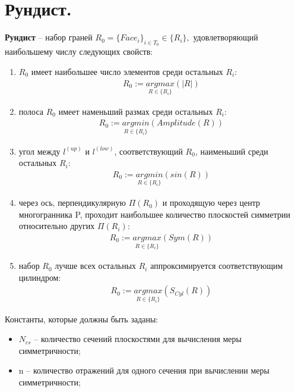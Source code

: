 \chapter{Рундист.}

\begin{definition}[Рундист]
	{\color{Black} \textbf{Рундист}} -- набор граней $R_0 = \{ Face_i\}_{i \in T_0} \in \{ R_i\},$ удовлетворяющий наибольшему числу следующих свойств:

	\begin{enumerate}
		\item $R_0$ имеет наибольшее число элементов среди остальных $R_i$:
		$$\begin{gathered}
		R_0 := \underset{R \in \{R_i\}}{argmax}(|R|)
		\end{gathered}$$

		\item полоса $R_0$ имеет наменьший размах среди остальных $R_i$:
		$$\begin{gathered}
		R_0 := \underset{R \in \{R_i\}}{argmin}(Amplitude(R))
		\end{gathered}$$

		\item угол между $l^{(up)}$ и $l^{(low)}$, соответствующий $R_0$, наименьший среди остальных $R_i$:
		$$\begin{gathered}
		R_0 := \underset{R \in \{R_i\}}{argmin}(sin(R))
		\end{gathered}$$

		\item через ось, перпендикулярную $\Pi(R_0)$ и проходящую через центр многогранника P, проходит наибольшее количество плоскостей симметрии относительно других $\Pi(R_i)$: 
		$$\begin{gathered}
		R_0 := \underset{R \in \{R_i\}}{argmax}(Sym(R))
		\end{gathered}$$

		\item набор $R_0$ лучше всех остальных $R_i$ аппроксимируется соответствующим цилиндром:
		$$\begin{gathered}
		R_0 := \underset{R \in \{R_i\}}{argmax}(S_{Cyl}(R))
		\end{gathered}$$

	\end{enumerate}
\end{definition}

\begin{remark}
	Константы, которые должны быть заданы:
	\begin{itemize}
		\item $N_{cs}$ -- количество сечений плоскостями для вычисления меры симметричности;
		\item n -- количество отражений для одного сечения при вычислении меры симметричности;
	\end{itemize}
\end{remark}
